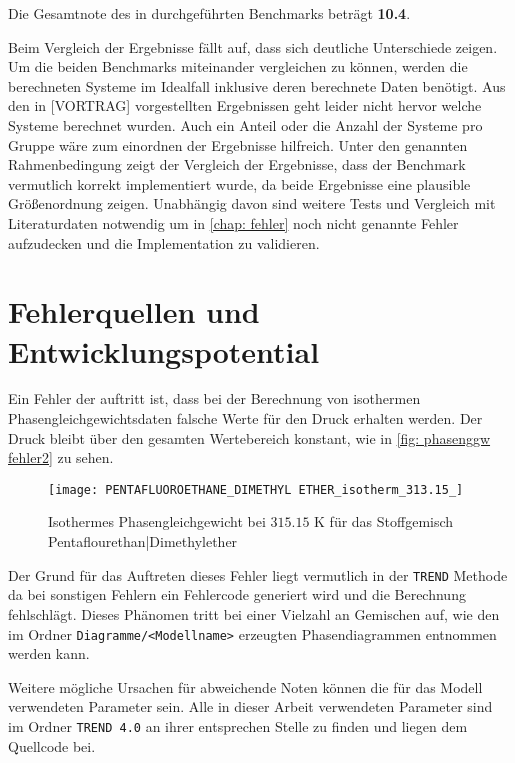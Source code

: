 \documentclass[../thesis.tex]{subfiles}
\begin{document}
Die Gesamtnote des in \cite{bibid} durchgeführten Benchmarks beträgt \textbf{10.4}.

Beim Vergleich der Ergebnisse fällt auf, dass sich deutliche Unterschiede zeigen. Um die beiden Benchmarks miteinander vergleichen zu können, werden die berechneten Systeme im Idealfall inklusive deren berechnete Daten benötigt. Aus den in [VORTRAG] \cite{bibid} vorgestellten Ergebnissen geht leider nicht hervor welche Systeme berechnet wurden. Auch ein Anteil oder die Anzahl der Systeme pro Gruppe wäre zum einordnen der Ergebnisse hilfreich. Unter den genannten Rahmenbedingung zeigt der Vergleich der Ergebnisse, dass der Benchmark vermutlich korrekt implementiert wurde, da beide Ergebnisse eine plausible Größenordnung zeigen. Unabhängig davon sind weitere Tests und Vergleich mit Literaturdaten notwendig um in \autoref{chap: fehler} noch nicht genannte Fehler aufzudecken und die Implementation zu validieren.


\chapter{Fehlerquellen und Entwicklungspotential}
\label{chap: fehler}

Ein Fehler der auftritt ist, dass bei der Berechnung von isothermen Phasengleichgewichtsdaten falsche Werte für den Druck erhalten werden. Der Druck bleibt über den gesamten Wertebereich konstant, wie in \autoref{fig: phasenggw fehler2} zu sehen.

\begin{figure}[htb]
	\centering
	\texttt{[image: PENTAFLUOROETHANE\_DIMETHYL ETHER\_isotherm\_313.15\_]}
	\caption{Isothermes Phasengleichgewicht bei $ 315$.$15$ K für das Stoffgemisch Pentaflourethan|Dimethylether}
	\label{fig: phasenggw fehler2}
\end{figure}
Der Grund für das Auftreten dieses Fehler liegt vermutlich in der \texttt{TREND} Methode da bei sonstigen Fehlern ein Fehlercode generiert wird und die Berechnung fehlschlägt. Dieses Phänomen tritt bei einer Vielzahl an Gemischen auf, wie den im Ordner \texttt{Diagramme/<Modellname>} erzeugten Phasendiagrammen  entnommen werden kann.

Weitere mögliche Ursachen für abweichende Noten können die für das Modell verwendeten Parameter sein. Alle in dieser Arbeit verwendeten Parameter sind im Ordner \texttt{TREND 4.0} an ihrer entsprechen Stelle zu finden und liegen dem Quellcode bei.
\end{document}
